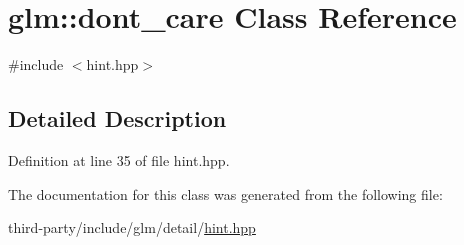 \hypertarget{classglm_1_1dont__care}{}\section{glm\+:\+:dont\+\_\+care Class Reference}
\label{classglm_1_1dont__care}


{\ttfamily \#include $<$hint.\+hpp$>$}



\subsection{Detailed Description}


Definition at line 35 of file hint.\+hpp.



The documentation for this class was generated from the following file\+:\begin{DoxyCompactItemize}
\item 
third-\/party/include/glm/detail/\hyperlink{hint_8hpp}{hint.\+hpp}\end{DoxyCompactItemize}
